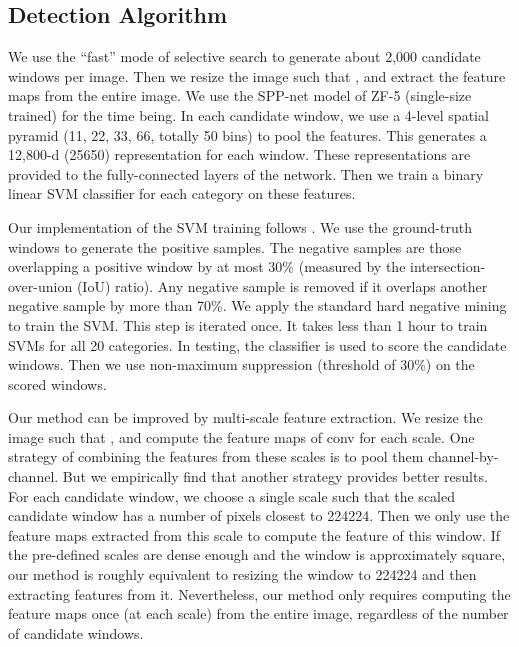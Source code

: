 \documentclass[10pt,journal,cspaper,compsoc]{IEEEtran}
\begin{document}
\subsection{Detection Algorithm}

We use the ``fast'' mode of selective search \cite{Sande2011} to generate about 2,000 candidate windows per image. Then we resize the image such that , and extract the feature maps from the entire image. We use the SPP-net model of ZF-5 (single-size trained) for the time being. In each candidate window, we use a 4-level spatial pyramid (11, 22, 33, 66, totally 50 bins) to pool the features. This generates a 12,800-d (25650) representation for each window. These representations are provided to the fully-connected layers of the network.
Then we train a binary linear SVM classifier for each category on these features.

Our implementation of the SVM training follows \cite{Sande2011,Girshick2014}. We use the ground-truth windows to generate the positive samples. The negative samples are those overlapping a positive window by at most 30\% (measured by the intersection-over-union (IoU) ratio). Any negative sample is removed if it overlaps another negative sample by more than 70\%. We apply the standard hard negative mining \cite{Felzenszwalb2010} to train the SVM. This step is iterated once. It takes less than 1 hour to train SVMs for all 20 categories.
In testing, the classifier is used to score the candidate windows. Then we use non-maximum suppression \cite{Felzenszwalb2010} (threshold of 30\%) on the scored windows.

Our method can be improved by multi-scale feature extraction. We resize the image such that , and compute the feature maps of conv for each scale. One strategy of combining the features from these scales is to pool them channel-by-channel. But we empirically find that another strategy provides better results. For each candidate window, we choose a single scale  such that the scaled candidate window has a number of pixels closest to 224224. Then we only use the feature maps extracted from this scale to compute the feature of this window. If the pre-defined scales are dense enough and the window is approximately square, our method is roughly equivalent to resizing the window to 224224 and then extracting features from it. Nevertheless, our method only requires computing the feature maps once (at each scale) from the entire image, regardless of the number of candidate windows.
\end{document}
